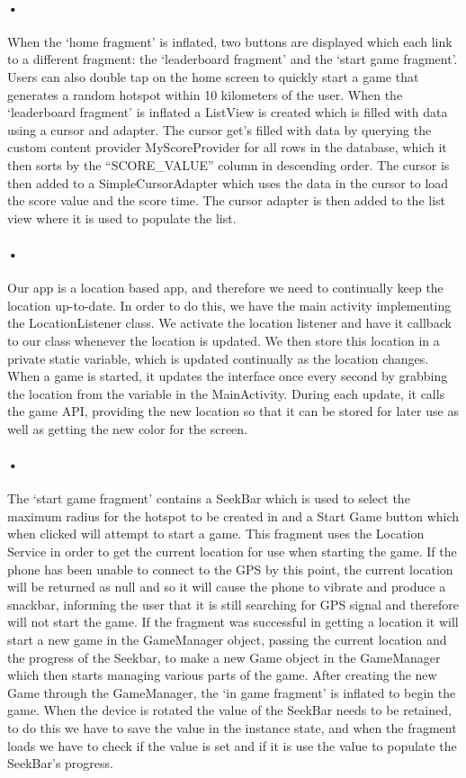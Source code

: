 \documentclass[10pt, a4paper]{article}
\begin{document}
\paragraph*{•}
When the `home fragment' is inflated, two buttons are displayed which each link to a different fragment: the `leaderboard fragment' and the `start game fragment'. Users can also double tap on the home screen to quickly start a game that generates a random hotspot within 10 kilometers of the user. When the `leaderboard fragment' is inflated a ListView is created which is filled with data using a cursor and adapter. The cursor get's filled with data by querying the custom content provider MyScoreProvider for all rows in the database, which it then sorts by the ``SCORE\_VALUE'' column in descending order. The cursor is then added to a SimpleCursorAdapter which uses the data in the cursor to load the score value and the score time. The cursor adapter is then added to the list view where it is used to populate the list.

\paragraph*{•}
Our app is a location based app, and therefore we need to continually keep the location up-to-date. In order to do this, we have the main activity implementing the LocationListener class. We activate the location listener and have it callback to our class whenever the location is updated. We then store this location in a private static variable, which is updated continually as the location changes. When a game is started, it updates the interface once every second by grabbing the location from the variable in the MainActivity. During each update, it calls the game API, providing the new location so that it can be stored for later use as well as getting the new color for the screen.

\paragraph*{•}
The `start game fragment' contains a SeekBar which is used to select the maximum radius for the hotspot to be created in and a Start Game button which when clicked will attempt to start a game. This fragment uses the Location Service in order to get the current location for use when starting the game. If the phone has been unable to connect to the GPS by this point, the current location will be returned as null and so it will cause the phone to vibrate and produce a snackbar, informing the user that it is still searching for GPS signal and therefore will not start the game. If the fragment was successful in getting a location it will start a new game in the GameManager object, passing the current location and the progress of the Seekbar, to make a new Game object in the GameManager which then starts managing various parts of the game.  After creating the new Game through the GameManager, the `in game fragment' is inflated to begin the game. When the device is rotated the value of the SeekBar needs to be retained, to do this we have to save the value in the instance state, and when the fragment loads we have to check if the value is set and if it is use the value to populate the SeekBar's progress.
\end{document}

